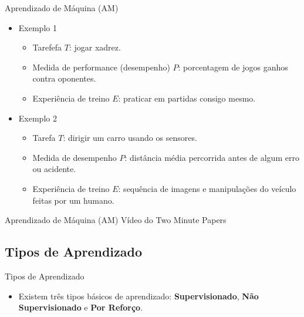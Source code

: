 \documentclass{libs/ufc_format}
\begin{document}
\begin{frame}{Aprendizado de Máquina (AM)}
    \begin{itemize}
        \item<1> Exemplo 1
            \begin{itemize}
                \justifying
                \item<1> Tarefefa $T$: jogar xadrez.
                \item<1> Medida de performance (desempenho) $P$: porcentagem de jogos ganhos contra oponentes.
                \item<1> Experiência de treino $E$: praticar em partidas consigo mesmo.
            \end{itemize}
        \item<2> Exemplo 2
            \begin{itemize}
                \item<2> Tarefa $T$: dirigir um carro usando os sensores.
                \item<2> Medida de desempenho $P$: distância média percorrida antes de algum erro ou acidente.
                \item<2> Experiência de treino $E$: sequência de imagens e manipulações do veículo feitas por um humano.
            \end{itemize}
    \end{itemize}
\end{frame}

\begin{frame}{Aprendizado de Máquina (AM)}
\centering
\large
Vídeo do Two Minute Papers \cite{tmp19}
\end{frame}

\subsection{Tipos de Aprendizado}

\begin{frame}{Tipos de Aprendizado}
    \begin{itemize}
        \justifying
        \item Existem três tipos básicos de aprendizado: \alert<2>{\textbf{Supervisionado}}, \textbf{Não Supervisionado} e \textbf{Por Reforço}.
    \end{itemize}
\end{frame}
\end{document}
